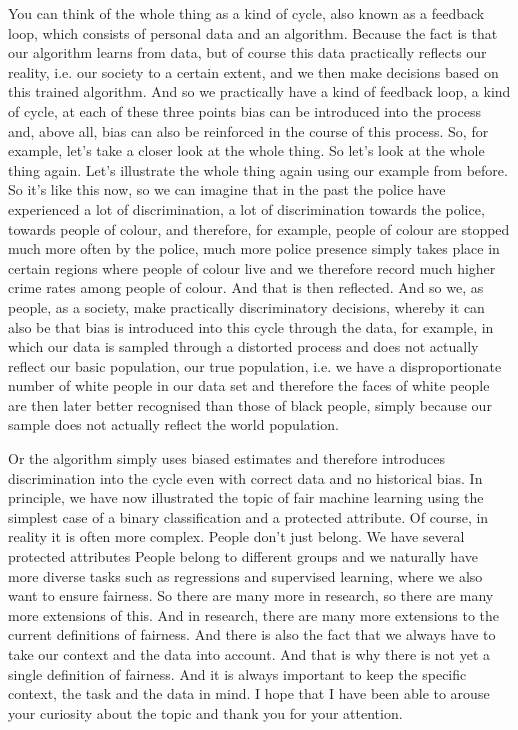 You can think of the whole thing as a kind of cycle, also known as a feedback loop, which consists of personal data and an algorithm. Because the fact is that our algorithm learns from data, but of course this data practically reflects our reality, i.e. our society to a certain extent, and we then make decisions based on this trained algorithm. And so we practically have a kind of feedback loop, a kind of cycle, at each of these three points bias can be introduced into the process and, above all, bias can also be reinforced in the course of this process. So, for example, let's take a closer look at the whole thing. So let's look at the whole thing again. Let's illustrate the whole thing again using our example from before. So it's like this now, so we can imagine that in the past the police have experienced a lot of discrimination, a lot of discrimination towards the police, towards people of colour, and therefore, for example, people of colour are stopped much more often by the police, much more police presence simply takes place in certain regions where people of colour live and we therefore record much higher crime rates among people of colour. And that is then reflected. And so we, as people, as a society, make practically discriminatory decisions, whereby it can also be that bias is introduced into this cycle through the data, for example, in which our data is sampled through a distorted process and does not actually reflect our basic population, our true population, i.e. we have a disproportionate number of white people in our data set and therefore the faces of white people are then later better recognised than those of black people, simply because our sample does not actually reflect the world population.

Or the algorithm simply uses biased estimates and therefore introduces discrimination into the cycle even with correct data and no historical bias. In principle, we have now illustrated the topic of fair machine learning using the simplest case of a binary classification and a protected attribute. Of course, in reality it is often more complex. People don't just belong. We have several protected attributes People belong to different groups and we naturally have more diverse tasks such as regressions and supervised learning, where we also want to ensure fairness. So there are many more in research, so there are many more extensions of this. And in research, there are many more extensions to the current definitions of fairness. And there is also the fact that we always have to take our context and the data into account. And that is why there is not yet a single definition of fairness. And it is always important to keep the specific context, the task and the data in mind. I hope that I have been able to arouse your curiosity about the topic and thank you for your attention.




